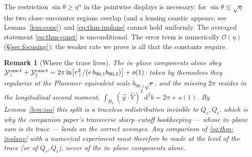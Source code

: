 \documentclass[11pt]{article}
\newcommand{\dd}{\mathrm{d}}
\newcommand{\rp}{r_\perp}
\newcommand{\Vh}{\hat V}
\newcommand{\Yp}{\mathcal Y_\perp}
\newcommand{\Ypa}{\mathcal Y_\parallel}
\newcommand{\order}[1]{\mathcal O\!\left(#1\right)}
\newtheorem{remark}{Remark}
\begin{document}
The restriction $\sin\theta\ge\eta^\alpha$ in the pointwise displays is necessary: for
$\sin\theta\lesssim\sqrt\eta$ the two close--encounter regions overlap (and a lensing caustic
appears; see Lemma~\ref{lem:cone}) and \eqref{eq:thm-inplane} cannot hold uniformly. The averaged
statement \eqref{eq:thm-const} is unconditional. The error term
is numerically $\order{\eta}$ (\S\ref{sec:focusing}); the weaker rate we prove is all that the
constants require.

\begin{remark}[Where the trace lives]
\label{rem:trace}
The in--plane components alone obey
$\Yp^{\rm exact}+\Ypa^{\rm exact}=2\pi\ln\!\big[\rp^2/(e\,b_{90,1}b_{90,2})\big]+o(1)$: taken by
themselves they regularize at the Plummer--equivalent scale $b_{90,i}\sqrt e$, and the missing
$2\pi$ resides in the longitudinal second moment,
$\int_{\Pi_V}(\vec y\cdot\Vh)^2\,\dd^2b=2\pi+o(1)$. By Lemma~\ref{lem:iso} this split is a
traceless redistribution invisible to $Q_r,Q_t$, which is why the companion paper's transverse
sharp--cutoff bookkeeping --- whose in--plane sum \emph{is} its trace --- lands on the correct
averages. Any comparison of \eqref{eq:thm-inplane} with a numerical experiment must therefore be
made at the level of the trace (or of $Q_r,Q_t$), never of the in--plane components alone.
\end{remark}
\end{document}
